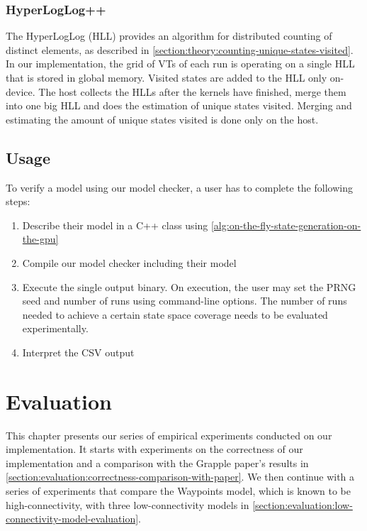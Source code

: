 \documentclass[
fancyheadings, %
%
%
]{stsreprt}
\begin{document}
\subsection{HyperLogLog++}

The HyperLogLog (HLL) provides an algorithm for distributed counting of distinct elements, as described in \cref{section:theory:counting-unique-states-visited}.
In our implementation, the grid of VTs of each run is operating on a single HLL that is stored in global memory.
Visited states are added to the HLL only on-device.
The host collects the HLLs after the kernels have finished, merge them into one big HLL and does the estimation of unique states visited.
Merging and estimating the amount of unique states visited is done only on the host.

\section{Usage}
\label{section:implementation:usage}

To verify a model using our model checker, a user has to complete the following steps:

\begin{enumerate}
    \item Describe their model in a C++ class using \cref{alg:on-the-fly-state-generation-on-the-gpu}
    \item Compile our model checker including their model
    \item Execute the single output binary.
          On execution, the user may set the PRNG seed and number of runs using command-line options.
          The number of runs needed to achieve a certain state space coverage needs to be evaluated experimentally.
    \item Interpret the CSV output
\end{enumerate}

\chapter{Evaluation}
\label{chapter:evaluation}

This chapter presents our series of empirical experiments conducted on our implementation.
It starts with experiments on the correctness of our implementation and a comparison with the Grapple paper's results in \cref{section:evaluation:correctness-comparison-with-paper}.
We then continue with a series of experiments that compare the Waypoints model, which is known to be high-connectivity, with three low-connectivity models in \cref{section:evaluation:low-connectivity-model-evaluation}.
\end{document}
